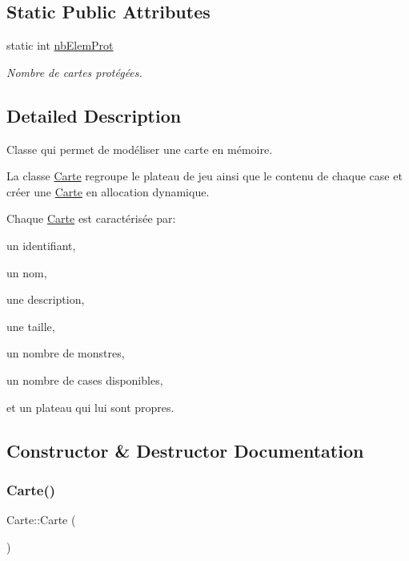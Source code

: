 \subsection*{Static Public Attributes}
\begin{DoxyCompactItemize}
\item 
static int \hyperlink{class_carte_a178a9ab642172029fec42f1c1cfa40ce}{nb\+Elem\+Prot}
\begin{DoxyCompactList}\small\item\em Nombre de cartes protégées. \end{DoxyCompactList}\end{DoxyCompactItemize}


\subsection{Detailed Description}
Classe qui permet de modéliser une carte en mémoire. 

La classe \hyperlink{class_carte}{Carte} regroupe le plateau de jeu ainsi que le contenu de chaque case et créer une \hyperlink{class_carte}{Carte} en allocation dynamique.

Chaque \hyperlink{class_carte}{Carte} est caractérisée par\+:

un identifiant,

un nom,

une description,

une taille,

un nombre de monstres,

un nombre de cases disponibles,

et un plateau qui lui sont propres. 

\subsection{Constructor \& Destructor Documentation}
\mbox{\label{class_carte_a06daaca86c31c80f8308f4a81d46dc9b}} 
\subsubsection{\texorpdfstring{Carte()}{Carte()}\hspace{0.1cm}{\footnotesize\ttfamily [1/2]}}
{\footnotesize\ttfamily Carte\+::\+Carte (\begin{DoxyParamCaption}{ }\end{DoxyParamCaption})}



